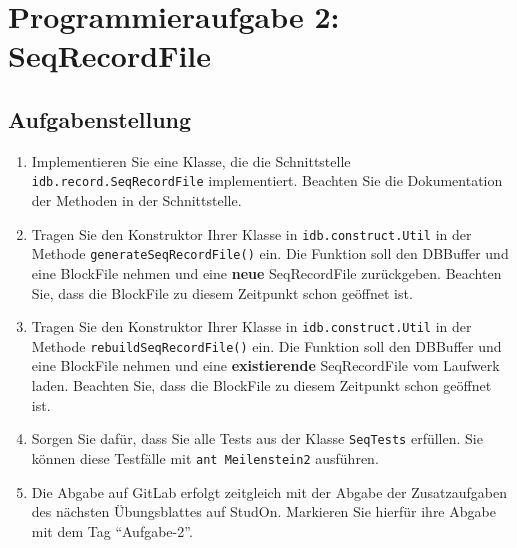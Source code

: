 \section{Programmieraufgabe 2: SeqRecordFile}

\subsection{Aufgabenstellung}
\begin{enumerate}
	\item Implementieren Sie eine Klasse, die die Schnittstelle \beamertxt{\linebreak}\texttt{idb.record.SeqRecordFile} implementiert.
		Beachten Sie die Dokumentation der Methoden in der Schnittstelle.
	\item Tragen Sie den Konstruktor Ihrer Klasse in \texttt{idb.construct.Util} in der Methode \texttt{generateSeqRecordFile()} ein.
		Die Funktion soll den DBBuffer und eine BlockFile nehmen und eine \textbf{neue} SeqRecordFile zurückgeben.
		Beachten Sie, dass die BlockFile zu diesem Zeitpunkt schon geöffnet ist.
	\item Tragen Sie den Konstruktor Ihrer Klasse in \texttt{idb.construct.Util} in der Methode \texttt{rebuildSeqRecordFile()} ein.
		Die Funktion soll den DBBuffer und eine BlockFile nehmen und eine \textbf{existierende} SeqRecordFile vom Laufwerk laden.
		Beachten Sie, dass die BlockFile zu diesem Zeitpunkt schon geöffnet ist.
	\item Sorgen Sie dafür, dass Sie alle Tests aus der Klasse \texttt{SeqTests} erfüllen.
	Sie können diese Testfälle mit \lstinline|ant Meilenstein2| ausführen.
	\item Die Abgabe auf GitLab erfolgt zeitgleich mit der Abgabe der Zusatzaufgaben des nächsten Übungsblattes auf StudOn. Markieren Sie hierfür ihre Abgabe mit dem Tag "`Aufgabe-2"'.
\end{enumerate}

